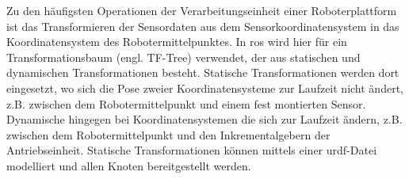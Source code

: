 Zu den häufigsten Operationen der Verarbeitungseinheit einer Roboterplattform ist das Transformieren der Sensordaten aus dem Sensorkoordinatensystem in das Koordinatensystem des Robotermittelpunktes. In \Gls{ros} wird hier für ein Transformationsbaum (engl. TF-Tree) verwendet, der aus statischen und dynamischen Transformationen besteht. Statische Transformationen werden dort eingesetzt, wo sich die Pose zweier Koordinatensysteme zur Laufzeit nicht ändert, z.B. zwischen dem Robotermittelpunkt und einem fest montierten Sensor. Dynamische hingegen bei Koordinatensystemen die sich zur Laufzeit ändern, z.B. zwischen dem Robotermittelpunkt und den Inkrementalgebern der Antriebseinheit. Statische Transformationen können mittels einer \Gls{urdf}-Datei modelliert und allen Knoten bereitgestellt werden.

